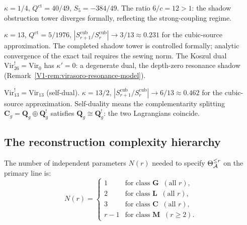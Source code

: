 \begin{example}[Ising model, $c = 1/2$]
$\kappa = 1/4$, $Q^{\mathrm{ct}} = 40/49$,
$S_5 = -384/49$.
The ratio $6/c = 12 > 1$: the shadow obstruction tower diverges
formally, reflecting the strong-coupling regime.
\end{example}

\begin{example}[Critical string, $c = 26$]
$\kappa = 13$, $Q^{\mathrm{ct}} = 5/1976$,
$|S_{r+1}^{\mathrm{cub}}/S_r^{\mathrm{cub}}|
\to 3/13 \approx 0.231$ for the cubic-source approximation.
The completed shadow tower is controlled formally; analytic convergence
of the exact tail requires the sewing norm. The Koszul dual
$\mathrm{Vir}_{26}^! = \mathrm{Vir}_0$ has $\kappa' = 0$:
a degenerate dual, the depth-zero resonance shadow
(Remark~\ref{V1-rem:virasoro-resonance-model}).
\end{example}

\begin{example}[Virasoro self-duality, $c = 13$]
$\mathrm{Vir}_{13}^! = \mathrm{Vir}_{13}$
(self-dual). $\kappa = 13/2$,
$|S_{r+1}^{\mathrm{cub}}/S_r^{\mathrm{cub}}|
\to 6/13 \approx 0.462$ for the cubic-source approximation.
Self-duality means the complementarity splitting
$\mathbf{C}_g = \mathbf{Q}_g \oplus \mathbf{Q}_g^!$
satisfies $\mathbf{Q}_g \cong \mathbf{Q}_g^!$:
the two Lagrangians coincide.
\end{example}


\subsection{The reconstruction complexity hierarchy}

\begin{theorem}
The number of independent parameters $N(r)$ needed to
specify $\Theta_{\mathcal{A}}^{\leq r}$ on the primary line is:
\begin{equation}%
N(r) = \begin{cases}
1 & \text{for class } \textbf{G}\;\;(\text{all } r), \\
2 & \text{for class } \textbf{L}\;\;(\text{all } r), \\
3 & \text{for class } \textbf{C}\;\;(\text{all } r), \\
r - 1 & \text{for class } \textbf{M}\;\;(r \geq 2).
\end{cases}
\end{equation}
\end{theorem}

